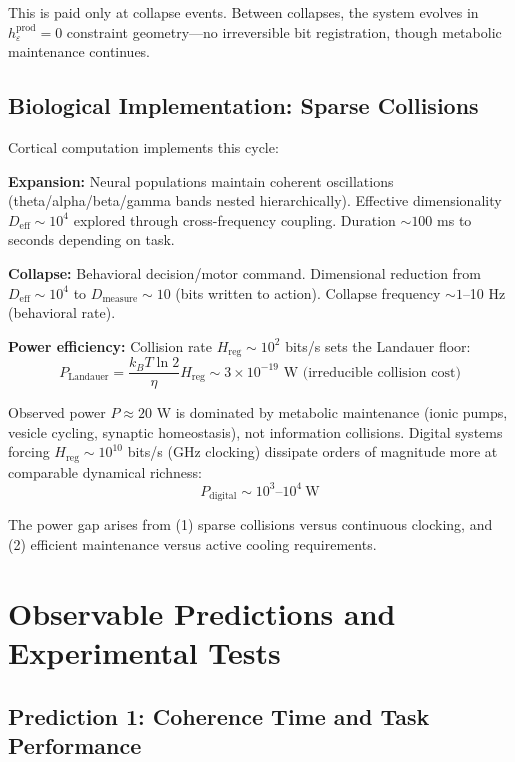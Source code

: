\documentclass[12pt]{article}
\begin{document}
This is paid only at collapse events. Between collapses, the system evolves in $h_\varepsilon^{\text{prod}} = 0$ constraint geometry---no irreversible bit registration, though metabolic maintenance continues.

\subsection{Biological Implementation: Sparse Collisions}

Cortical computation implements this cycle:

\textbf{Expansion:} Neural populations maintain coherent oscillations (theta/alpha/beta/gamma bands nested hierarchically). Effective dimensionality $D_{\text{eff}} \sim 10^4$ explored through cross-frequency coupling. Duration $\sim 100$ ms to seconds depending on task.

\textbf{Collapse:} Behavioral decision/motor command. Dimensional reduction from $D_{\text{eff}} \sim 10^4$ to $D_{\text{measure}} \sim 10$ (bits written to action). Collapse frequency $\sim 1$--10 Hz (behavioral rate).

\textbf{Power efficiency:} Collision rate $H_{\text{reg}} \sim 10^2$ bits/s sets the Landauer floor:
\begin{equation}
P_{\text{Landauer}} = \frac{k_B T \ln 2}{\eta} H_{\text{reg}} \sim 3 \times 10^{-19} \text{ W (irreducible collision cost)}
\end{equation}

Observed power $P \approx 20$ W is dominated by metabolic maintenance (ionic pumps, vesicle cycling, synaptic homeostasis), not information collisions. Digital systems forcing $H_{\text{reg}} \sim 10^{10}$ bits/s (GHz clocking) dissipate orders of magnitude more at comparable dynamical richness:
\begin{equation}
P_{\text{digital}} \sim 10^3\text{--}10^4~\mathrm{W}
\end{equation}

The power gap arises from (1) sparse collisions versus continuous clocking, and (2) efficient maintenance versus active cooling requirements.

\section{Observable Predictions and Experimental Tests}

\subsection{Prediction 1: Coherence Time and Task Performance}
\end{document}
